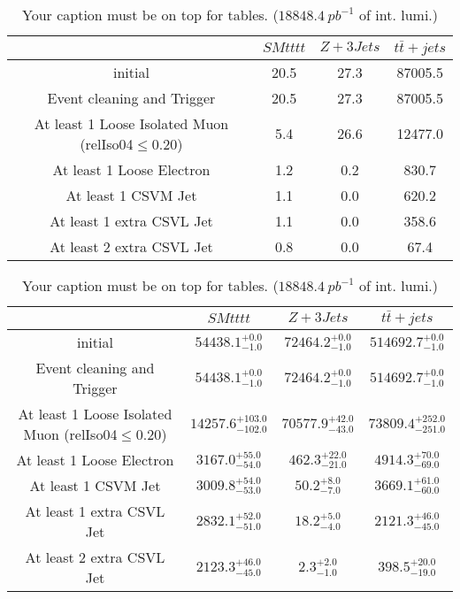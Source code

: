 \documentclass{article}
\begin{document}
\begin{table}
\caption{Your caption must be on top for tables. ($18848.4~pb^{-1}$ of int. lumi.)}
\label{tab:}
\centering
\begin{tabular}{|c|ccc|}
\toprule
&$SM tttt$	&$Z+3Jets$	&$t\bar{t}+jets$	\\

\midrule
initial&	20.5	&27.3	&87005.5	\\

Event cleaning and Trigger&	20.5	&27.3	&87005.5	\\

At least 1 Loose Isolated Muon (relIso04$\leq 0.20$)&	5.4	&26.6	&12477.0	\\

At least 1 Loose Electron&	1.2	&0.2	&830.7	\\

At least 1 CSVM Jet&	1.1	&0.0	&620.2	\\

At least 1 extra CSVL Jet&	1.1	&0.0	&358.6	\\

At least 2 extra CSVL Jet&	0.8	&0.0	&67.4	\\

\bottomrule
\end{tabular}
\end{table}
\begin{table}
\caption{Your caption must be on top for tables. ($18848.4~pb^{-1}$ of int. lumi.)}
\label{tab:}
\centering
\begin{tabular}{|c|ccc|}
\toprule
&$SM tttt$	&$Z+3Jets$	&$t\bar{t}+jets$	\\

\midrule
initial&	$54438.1^{+0.0}_{-1.0}$	&$72464.2^{+0.0}_{-1.0}$	&$514692.7^{+0.0}_{-1.0}$	\\

Event cleaning and Trigger&	$54438.1^{+0.0}_{-1.0}$	&$72464.2^{+0.0}_{-1.0}$	&$514692.7^{+0.0}_{-1.0}$	\\

At least 1 Loose Isolated Muon (relIso04$\leq 0.20$)&	$14257.6^{+103.0}_{-102.0}$	&$70577.9^{+42.0}_{-43.0}$	&$73809.4^{+252.0}_{-251.0}$	\\

At least 1 Loose Electron&	$3167.0^{+55.0}_{-54.0}$	&$462.3^{+22.0}_{-21.0}$	&$4914.3^{+70.0}_{-69.0}$	\\

At least 1 CSVM Jet&	$3009.8^{+54.0}_{-53.0}$	&$50.2^{+8.0}_{-7.0}$	&$3669.1^{+61.0}_{-60.0}$	\\

At least 1 extra CSVL Jet&	$2832.1^{+52.0}_{-51.0}$	&$18.2^{+5.0}_{-4.0}$	&$2121.3^{+46.0}_{-45.0}$	\\

At least 2 extra CSVL Jet&	$2123.3^{+46.0}_{-45.0}$	&$2.3^{+2.0}_{-1.0}$	&$398.5^{+20.0}_{-19.0}$	\\

\bottomrule
\end{tabular}
\end{table}
\end{document}
